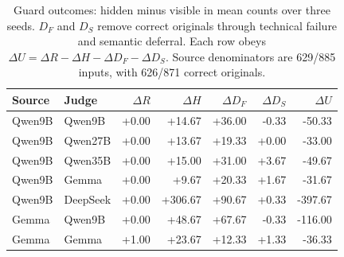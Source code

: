 \begin{table}[t]
\centering
\small
\caption{Guard outcomes: hidden minus visible in mean counts over three seeds. $D_F$ and $D_S$ remove correct originals through technical failure and semantic deferral. Each row obeys $\Delta U=\Delta R-\Delta H-\Delta D_F-\Delta D_S$. Source denominators are 629/885 inputs, with 626/871 correct originals.}
\label{tab:guard_accounting}
\begin{tabular}{llrrrrr}
\toprule
Source & Judge & $\Delta R$ & $\Delta H$ & $\Delta D_F$ & $\Delta D_S$ & $\Delta U$ \\
\midrule
Qwen9B & Qwen9B & +0.00 & +14.67 & +36.00 & -0.33 & -50.33 \\
Qwen9B & Qwen27B & +0.00 & +13.67 & +19.33 & +0.00 & -33.00 \\
Qwen9B & Qwen35B & +0.00 & +15.00 & +31.00 & +3.67 & -49.67 \\
Qwen9B & Gemma & +0.00 & +9.67 & +20.33 & +1.67 & -31.67 \\
Qwen9B & DeepSeek & +0.00 & +306.67 & +90.67 & +0.33 & -397.67 \\
Gemma & Qwen9B & +0.00 & +48.67 & +67.67 & -0.33 & -116.00 \\
Gemma & Gemma & +1.00 & +23.67 & +12.33 & +1.33 & -36.33 \\
\bottomrule
\end{tabular}
\end{table}
